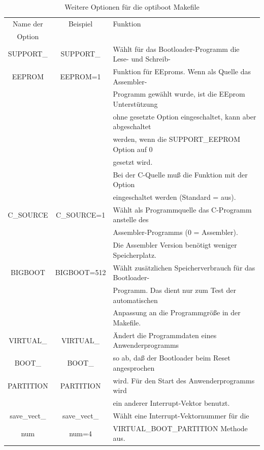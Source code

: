 \begin{table}[H]
  \begin{center}
    \begin{tabular}{| c | c | l |}
    \hline
   Name der        & Beispiel       & Funktion                                            \\
    Option         &                &                                                     \\
    \hline
    \hline
    SUPPORT\_      & SUPPORT\_      & Wählt für das Bootloader-Programm die Lese- und Schreib- \\
    EEPROM         &  EEPROM=1      & Funktion für EEproms. Wenn als Quelle das Assembler- \\
                   &                & Programm gewählt wurde, ist die EEprom Unterstützung \\
                   &                & ohne gesetzte Option eingeschaltet, kann aber abgeschaltet\\
                   &                & werden, wenn die SUPPORT\_EEPROM Option auf 0 \\
                   &                & gesetzt wird. \\
                   &                & Bei der C-Quelle muß die Funktion mit der Option \\
                   &                & eingeschaltet werden (Standard = aus). \\
    \hline
 C\_SOURCE         & C\_SOURCE=1    & Wählt als Programmquelle das C-Programm anstelle des  \\
                   &                & Assembler-Programms (0 = Assembler).\\
                   &                & Die Assembler Version benötigt weniger Speicherplatz. \\
    \hline
 BIGBOOT           & BIGBOOT=512    & Wählt zusätzlichen Speicherverbrauch für das Bootloader- \\
                   &                & Programm. Das dient nur zum Test der automatischen \\
                   &                & Anpassung an die Programmgröße in der Makefile. \\
    \hline
VIRTUAL\_          & VIRTUAL\_       &  Ändert die Programmdaten eines Anwenderprogramms \\
 BOOT\_            & BOOT\_          & so ab, daß der Bootloader beim Reset angesprochen \\
 PARTITION         & PARTITION       & wird. Für den Start des Anwenderprogramms wird \\
		   &                 & ein anderer Interrupt-Vektor benutzt.          \\
    \hline
 save\_vect\_      & save\_vect\_    & Wählt eine Interrupt-Vektornummer für die  \\
      num          &    num=4        & VIRTUAL\_BOOT\_PARTITION Methode aus.        \\
    \hline
    \end{tabular}
  \end{center}
  \caption{Weitere Optionen für die optiboot Makefile}
  \label{tab:options2}
\end{table}

